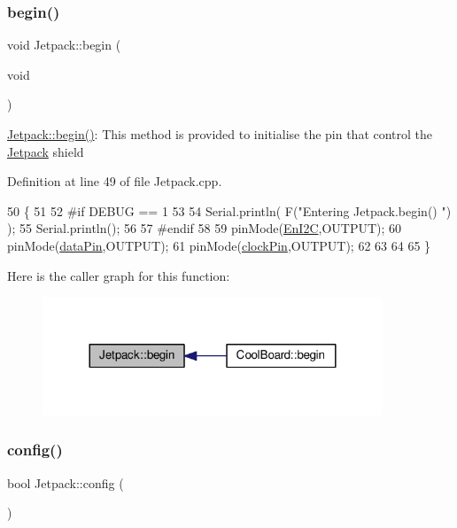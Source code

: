 \subsubsection{\texorpdfstring{begin()}{begin()}}
{\footnotesize\ttfamily void Jetpack\+::begin (\begin{DoxyParamCaption}\item[{void}]{ }\end{DoxyParamCaption})}

\hyperlink{class_jetpack_a5a53e1ebf7aaf3bf3e0d37ea64ca09a7}{Jetpack\+::begin()}\+: This method is provided to initialise the pin that control the \hyperlink{class_jetpack}{Jetpack} shield 

Definition at line 49 of file Jetpack.\+cpp.


\begin{DoxyCode}
50 \{
51 
52 \textcolor{preprocessor}{#if DEBUG == 1 }
53  
54     Serial.println( F(\textcolor{stringliteral}{"Entering Jetpack.begin() "}) );
55     Serial.println();
56 
57 \textcolor{preprocessor}{#endif}
58 
59     pinMode(\hyperlink{class_jetpack_a81df984fb4cea98c71aa1a1cfcdfe814}{EnI2C},OUTPUT);
60     pinMode(\hyperlink{class_jetpack_a3d669a56e93c71dd25f970d4ed7d0c00}{dataPin},OUTPUT);
61     pinMode(\hyperlink{class_jetpack_a58ebb991f358f3ae94e82148b0221b5a}{clockPin},OUTPUT);
62     
63     
64 
65 \}
\end{DoxyCode}
Here is the caller graph for this function\+:\nopagebreak
\begin{figure}[H]
\begin{center}
\leavevmode
\includegraphics[width=288pt]{df/d1d/class_jetpack_a5a53e1ebf7aaf3bf3e0d37ea64ca09a7_icgraph}
\end{center}
\end{figure}
\mbox{\label{class_jetpack_ab065ee83e244265a2223a22f3ee4a719}} 
\subsubsection{\texorpdfstring{config()}{config()}}
{\footnotesize\ttfamily bool Jetpack\+::config (\begin{DoxyParamCaption}{ }\end{DoxyParamCaption})}

